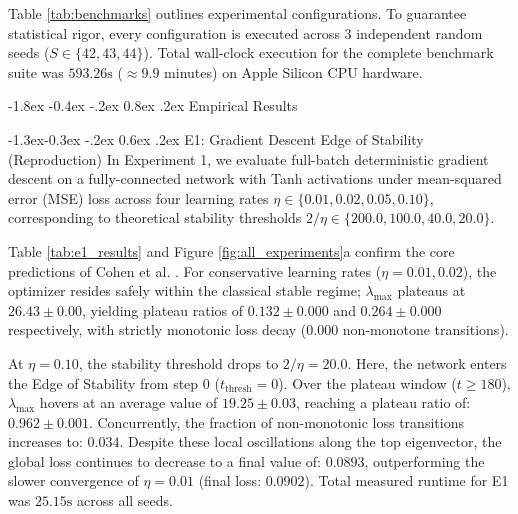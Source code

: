 \documentclass[10pt,twocolumn]{article}
\makeatletter
\renewcommand\section{\@startsection {section}{1}{\z@}%
                                   {-1.8ex \@plus -0.4ex \@minus -.2ex}%
                                   {0.8ex \@plus .2ex}%
                                   {\normalfont\large\bfseries}}
\renewcommand\subsection{\@startsection{subsection}{2}{\z@}%
                                     {-1.3ex\@plus -0.3ex \@minus -.2ex}%
                                     {0.6ex \@plus .2ex}%
                                     {\normalfont\normalsize\bfseries}}
\makeatother
\begin{document}
Table \ref{tab:benchmarks} outlines experimental configurations. To guarantee statistical rigor, every configuration is executed across 3 independent random seeds ($S \in \{42, 43, 44\}$). Total wall-clock execution for the complete benchmark suite was $593.26\text{s}$ ($\approx 9.9$ minutes) on Apple Silicon CPU hardware.

\section{Empirical Results}

\subsection{E1: Gradient Descent Edge of Stability (Reproduction)}
In Experiment 1, we evaluate full-batch deterministic gradient descent on a fully-connected network with Tanh activations under mean-squared error (MSE) loss across four learning rates $\eta \in \{0.01, 0.02, 0.05, 0.10\}$, corresponding to theoretical stability thresholds $2/\eta \in \{200.0, 100.0, 40.0, 20.0\}$.

Table \ref{tab:e1_results} and Figure \ref{fig:all_experiments}a confirm the core predictions of Cohen et al. \cite{cohen2021gradient}. For conservative learning rates ($\eta = 0.01, 0.02$), the optimizer resides safely within the classical stable regime; $\lambda_{\max}$ plateaus at $26.43 \pm 0.00$, yielding plateau ratios of $0.132 \pm 0.000$ and $0.264 \pm 0.000$ respectively, with strictly monotonic loss decay ($0.000$ non-monotone transitions).

At $\eta = 0.10$, the stability threshold drops to $2/\eta = 20.0$. Here, the network enters the Edge of Stability from step 0 ($t_{\text{thresh}} = 0$). Over the plateau window ($t \ge 180$), $\lambda_{\max}$ hovers at an average value of $19.25 \pm 0.03$, reaching a plateau ratio of:
$0.962 \pm 0.001$.
Concurrently, the fraction of non-monotonic loss transitions increases to:
$0.034$.
Despite these local oscillations along the top eigenvector, the global loss continues to decrease to a final value of:
$0.0893$,
outperforming the slower convergence of $\eta = 0.01$ (final loss:
$0.0902$). Total measured runtime for E1 was $25.15\text{s}$ %
across all seeds.
\end{document}
